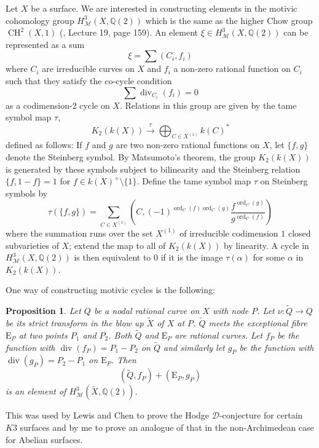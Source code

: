 \documentclass[11pt,a4paper]{article}
\newtheorem{prop}[defn]{Proposition}
\newcommand {\Q}{{\mathds Q}}
\newcommand {\M}{{\mathcal M}}
\newcommand {\RE}{{{\mathrm E}}}
\def\div{\operatorname{div}}
\def\ord{\operatorname{ord}}
\DeclareMathOperator{\CH}{CH}
\begin{document}
Let $X$ be a surface. We are interested in constructing elements in the motivic cohomology group $H^3_{\M}(X,\Q(2))$ which is the same as the higher Chow group $\CH^2(X,1)$ (\cite{MVW}, Lecture 19, page 159). An element $\xi \in H^3_{\M}(X, \Q(2))$ can be represented as a sum 
%
$$\xi=\sum (C_i,f_i)$$
% 
where $C_i$ are irreducible curves on $X$ and $f_i$ a non-zero rational function on $C_i$ such that they satisfy the co-cycle condition 
%
$$\sum \div_{C_i}(f_i)=0$$ 
%
as a codimension-2 cycle on $X$.
Relations in this group are given by the tame symbol map $\tau$,
%
$$K_2(k(X)) \stackrel{\tau}{\longrightarrow} \bigoplus_{C \in X^{(1)}}  k(C)^*$$
%
defined as follows: If $f$ and $g$ are two non-zero rational functions on $X$, let $\{f, g\}$ denote the Steinberg symbol. By Matsumoto's theorem, the group $K_2(k(X))$ is generated by these symbols subject to bilinearity and the Steinberg relation $\{f, 1-f\} = 1$ for $f \in k(X)^\times \setminus \{1\}$. Define the tame symbol map $\tau$ on Steinberg symbols by 
%
$$\tau(\{f,g\})= \sum_{C \in  X^{(1)}} \left(C,(-1)^{\ord_C(f)\ord_C(g)}\frac{f^{\ord_C(g)}}{g^{\ord_C(f)}}\right) $$
%
where the summation runs over the set $X^{(1)}$ of irreducible codimension $1$ closed subvarieties of $X$; extend the map to all of $K_2(k(X))$ by linearity. A cycle in $H^3_{\M}(X,\Q(2))$ is then equivalent to $0$ if it is the image $\tau(\alpha)$ for some $\alpha$ in $K_2(k(X))$.



One way of constructing motivic cycles is the following: 

\begin{prop}\label{prop-higher-chow-cycles-blow-up}  
Let $Q$ be a {\em nodal rational curve} on $X$ with node $P$. Let $\nu:\tilde{Q}\rightarrow Q$ be its strict transform in the blow up $\tilde{X}$ of $X$ at $P$.  $\tilde{Q}$ meets the exceptional fibre $\RE_P$ at two points $P_1$ and $P_2$. Both $\tilde{Q}$ and $\RE_P$ are rational curves. Let $f_P$ be the function with $\div(f_P)=P_1-P_2$ on $\tilde{Q}$ and similarly let $g_P$ be the function with $\div(g_P)=P_2-P_1$ on $\RE_P$. Then 
	$$(\tilde{Q},f_P)+(\RE_P,g_P)$$
	is an element of $H^3_{\M}(\tilde{X},\Q(2))$. 
	\label{construction}
\end{prop}
%
This was used by Lewis and Chen \cite{chle} to prove the Hodge ${\mathcal D}$-conjecture for certain $K3$ surfaces  and by me \cite{sree2014} to prove an analogue of that in the non-Archimedean case for Abelian surfaces.  
\end{document}
